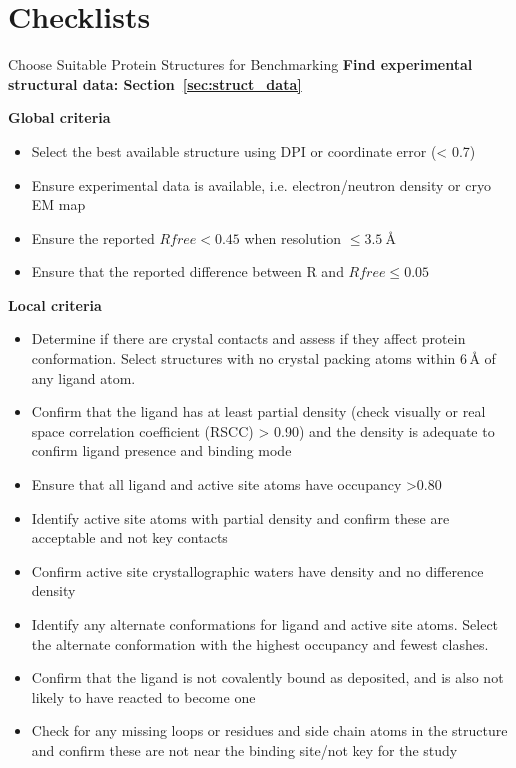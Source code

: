 \documentclass[9pt,bestpractices]{livecoms}
\begin{document}
\section{Checklists}
\label{sec:checklists}
\begin{Checklists*}[hp!]
\begin{checklist}{Choose Suitable Protein Structures for Benchmarking}
\textbf{Find experimental structural data: Section~\ref{sec:struct_data}}

    \textbf{Global criteria}
    \begin{itemize}
        \item Select the best available structure using DPI or coordinate error (< 0.7)
        \item Ensure experimental data is available, i.e. electron/neutron density or cryo EM map
        \item Ensure the reported $Rfree < 0.45$ when resolution $\le 3.5~$\AA{}
        \item Ensure that the reported difference between R and $Rfree \le 0.05$
        \end{itemize}
    \textbf{Local criteria}
    \begin{itemize}
        \item Determine if there are crystal contacts and assess if they affect protein conformation. Select structures with no crystal packing atoms within $6\,$\AA{} of any ligand atom.
        \item Confirm that the ligand has at least partial density (check visually or real space correlation coefficient (RSCC) > 0.90) and the density is adequate to confirm ligand presence and binding mode
        \item Ensure that all ligand and active site atoms have occupancy >0.80
        \item Identify active site atoms with partial density and confirm these are acceptable and not key contacts
        \item Confirm active site crystallographic waters have density and no difference density
        \item Identify any alternate conformations for ligand and active site atoms. Select the alternate conformation with the highest occupancy and fewest clashes. 
        \item Confirm that the ligand is not covalently bound as deposited, and is also not likely to have reacted to become one
        \item Check for any missing loops or residues and side chain atoms in the structure and confirm these are not near the binding site/not key for the study

\end{itemize}
\end{checklist}
\end{Checklists*}
\end{document}
